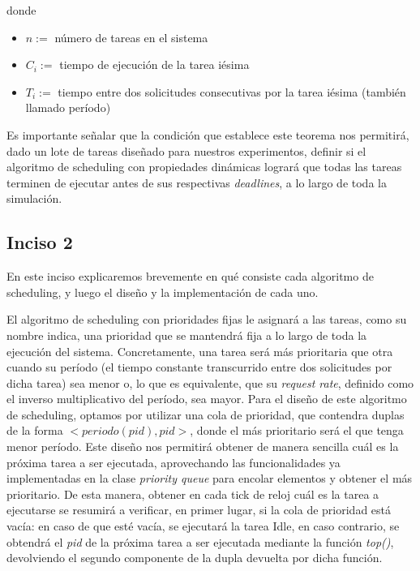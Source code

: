 donde
\begin{itemize}
  \item $n:=$ n\'umero de tareas en el sistema
  \item $C_{i}:=$ tiempo de ejecuci\'on de la tarea i\'esima
  \item $T_{i}:=$ tiempo entre dos solicitudes consecutivas por la tarea i\'esima (tambi\'en llamado per\'iodo)
\end{itemize}

Es importante se\~nalar que la condici\'on que establece este teorema nos permitir\'a, dado un lote de tareas dise\~nado para nuestros experimentos, definir 
si el algoritmo de scheduling con propiedades din\'amicas lograr\'a que todas las tareas terminen de ejecutar antes de sus respectivas \textit{deadlines}, a lo 
largo de toda la simulaci\'on.

\subsection*{Inciso 2}

En este inciso explicaremos brevemente en qu\'e consiste cada algoritmo de scheduling, y luego el dise\~no y la implementaci\'on de cada uno.

El algoritmo de scheduling con prioridades fijas le asignar\'a a las tareas, como su nombre indica, una prioridad que se mantendr\'a fija a lo largo de 
toda la ejecuci\'on del sistema. Concretamente, una tarea ser\'a m\'as prioritaria que otra cuando su per\'iodo (el tiempo constante transcurrido entre
dos solicitudes por dicha tarea) sea menor o, lo que es equivalente, que su \textit{request rate}, definido como el inverso multiplicativo del per\'iodo,
sea mayor. Para el dise\~no de este algoritmo de scheduling, optamos por utilizar una cola de prioridad, que contendra duplas de la forma 
$<periodo(pid),pid>$, donde el m\'as prioritario ser\'a el que tenga menor per\'iodo. Este dise\~no nos permitir\'a obtener de manera sencilla cu\'al es
la pr\'oxima tarea a ser ejecutada, aprovechando las funcionalidades ya implementadas en la clase \textit{priority queue} para encolar elementos y obtener
el m\'as prioritario. De esta manera, obtener en cada tick de reloj cu\'al es la tarea a ejecutarse se resumir\'a a verificar, en primer lugar, si la 
cola de prioridad est\'a vac\'ia: en caso de que est\'e vac\'ia, se ejecutar\'a la tarea Idle, en caso contrario, se obtendr\'a el \textit{pid} de la 
pr\'{o}xima tarea a ser ejecutada mediante la funci\'on \textit{top()}, devolviendo el segundo componente de la dupla devuelta por dicha funci\'on.

